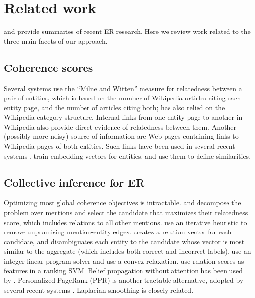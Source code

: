 \section{Related work}
\label{sec:related}

 and  provide
summaries of recent ER research.  Here we review work related to the
three main facets of our approach.


\subsection{Coherence scores}

Several systems \cite{Milne2008,KulkarniSRC09,Hoffart2011} use the
``Milne and Witten'' measure for relatedness between a pair of
entities, which is based on the number of Wikipedia articles citing
each entity page, and the number of articles citing both;
 has also relied on the Wikipedia category
structure.  Internal links from one entity page to another in
Wikipedia also provide direct evidence of relatedness between them.
Another (possibly more noisy) source of information are Web pages
containing links \cite{singh12:wiki-links} to Wikipedia pages of both
entities.  Such links have been used in several recent systems
\cite{ChengR13,Chisholm2015}.   train embedding
vectors for entities, and use them to define similarities.


\subsection{Collective inference for ER}

Optimizing most global coherence objectives is
intractable.  and  decompose
the problem over mentions and select the candidate that maximizes
their relatedness score, which includes relations to all other
mentions.   use
an iterative heuristic to remove unpromising
mention-entity edges.   creates a relation vector
for each candidate, and disambiguates each entity to the candidate
whose vector is most similar to the aggregate (which includes both
correct and incorrect labels).   use an integer
linear program solver and  use a convex
relaxation.   use relation scores as features in a
ranking SVM.  Belief propagation without attention has been used
by .
Personalized PageRank (PPR) \cite{jeh2003scaling} is another tractable
alternative, adopted by several recent systems
\cite{Han2011,He13,Alhelbawy14,Pershina2015}.
Laplacian smoothing \cite{Huang2014} is closely related.

